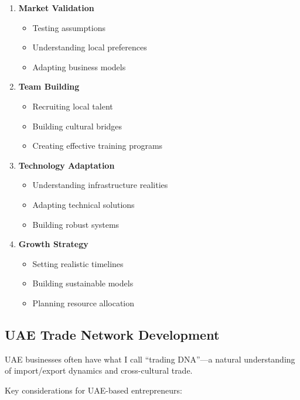 \begin{enumerate}
    \item \textbf{Market Validation}
    \begin{itemize}
        \item Testing assumptions
        \item Understanding local preferences
        \item Adapting business models
    \end{itemize}

    \item \textbf{Team Building}
    \begin{itemize}
        \item Recruiting local talent
        \item Building cultural bridges
        \item Creating effective training programs
    \end{itemize}

    \item \textbf{Technology Adaptation}
    \begin{itemize}
        \item Understanding infrastructure realities
        \item Adapting technical solutions
        \item Building robust systems
    \end{itemize}

    \item \textbf{Growth Strategy}
    \begin{itemize}
        \item Setting realistic timelines
        \item Building sustainable models
        \item Planning resource allocation
    \end{itemize}
\end{enumerate}
\subsection{UAE Trade Network Development}\label{subsec:uae-trade-development-1}

UAE businesses often have what I call ``trading DNA''—a natural understanding of import/export dynamics and cross-cultural trade.

Key considerations for UAE-based entrepreneurs:

